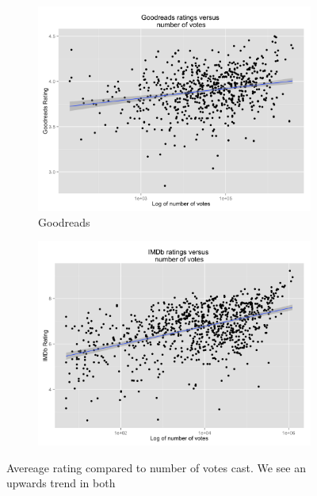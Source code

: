 \documentclass[12pt]{article}
\begin{document}
\begin{figure}[!ht]
  \begin{subfigure}[b]{.5\linewidth}
    \centering
    \includegraphics[scale=0.1]{ratingsbooks}
    \caption{Goodreads}
    \label{fig:1a}
  \end{subfigure}%
  \begin{subfigure}[b]{.5\linewidth}
    \centering
    \includegraphics[scale=0.1]{ratingsimdb}
    \label{fig:1b}
  \end{subfigure}
  \caption{Avereage rating compared to number of votes cast. We see an upwards trend in both}
  \label{fig:1}
\end{figure}
\end{document}
